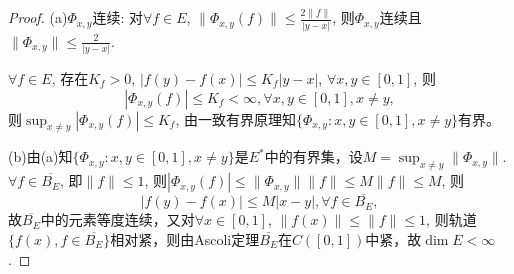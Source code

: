 \documentclass[a4paper,8pt]{ctexart}\textwidth 140mm \textheight 216mm
\newcommand{\8}{\infty}
\begin{document}
\begin{proof}
	(a)$\Phi_{x,y}$连续: 对$\forall f\in E$, $\|\Phi_{x,y}(f)\|\leq \frac{2\|f\|}{|y-x|}$, 
	则$\Phi_{x,y}$连续且$\|\Phi_{x,y}\|\leq \frac{2}{|y-x|}$.
	
	$\forall f\in E$, 存在$K_f>0$, $|f(y)-f(x)|\leq K_f|y-x|$, $\forall x,y\in[0,1]$, 则
	$$|\Phi_{x,y}(f)|\leq K_f<\infty,\forall x,y\in[0,1],x\ne y,$$
	则$\sup_{x\ne y}|\Phi_{x,y}(f)|\leq K_f$, 由一致有界原理知$\{\Phi_{x,y}:x,y\in[0,1],x\ne y\}$有界。
	
	(b)由(a)知$\{\Phi_{x,y}:x,y\in[0,1],x\ne y\}$是$E^*$中的有界集，设$M=\sup_{x\ne y}\|\Phi_{x,y}\|$. $\forall f\in \overline{B_E}$, 即$\|f\|\leq 1$, 则$|\Phi_{x,y}(f)|\leq \|\Phi_{x,y}\|\|f\|\leq M\|f\|\leq M$, 则
	$$|f(y)-f(x)|\leq M|x-y|,\forall f\in\overline{B_E},$$
	故$\overline{B_E}$中的元素等度连续，又对$\forall x\in[0,1]$, $\|f(x)\|\leq\|f\|\leq 1$, 则轨道$\{f(x),f\in\overline{B_E}\}$相对紧，则由Ascoli定理$\overline{B_E}$在$C([0,1])$中紧，故$\dim E<\infty$. 
\end{proof}
\end{document}
